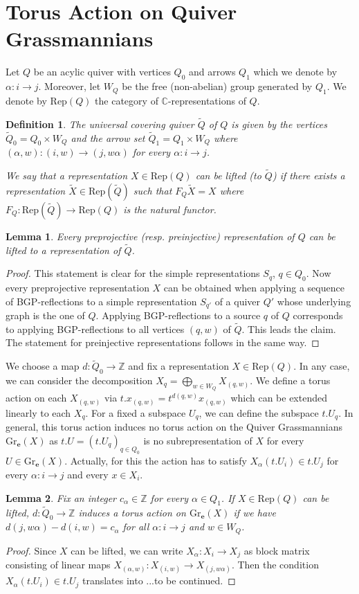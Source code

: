 \documentclass{amsart}
\newtheorem{definition}{Definition}[theorem]
\newtheorem{lemma}{Lemma}[theorem]
\newcommand{\bfe}{\mathbf{e}}
\newcommand{\C}{\mathbb{C}}
\newcommand{\Rep}{\mathrm{Rep}}
\newcommand{\Gr}{\mathrm{Gr}}
\newcommand{\ZZ}{\mathbb{Z}}
\begin{document}
\section{Torus Action on Quiver Grassmannians}
\noindent Let $Q$ be an acylic quiver with vertices $Q_0$ and arrows $Q_1$ which we denote by $\alpha:i\to j$. Moreover, let $W_{Q}$ be the free (non-abelian) group generated by $Q_1$.  We denote by $\Rep(Q)$ the category of $\C$-representations of $Q$.
\begin{definition}
The universal covering quiver $\tilde Q$ of $Q$ is given by the vertices $\tilde Q_0=Q_0\times W_{Q}$ and the arrow set $\tilde Q_1=Q_1\times W_{Q}$ where $(\alpha,w):(i,w)\to (j,w\alpha)$ for every $\alpha:i\to j$.

We say that a representation $X\in \Rep(Q)$ can be lifted (to $\tilde Q$) if there exists a representation $\tilde X\in\Rep(\tilde Q)$ such that $F_Q\tilde X=X$ where $F_Q:\Rep(\tilde Q)\to\Rep(Q)$ is the natural functor.
\end{definition}
\begin{lemma}
  Every preprojective (resp. preinjective) representation of $Q$ can be lifted to a representation of $\tilde Q$.
\end{lemma}
\begin{proof}This statement is clear for the simple representations $S_q$, $q\in Q_0$. Now every preprojective representation $X$ can be obtained when applying a sequence of BGP-reflections \cite{bgp} to a simple representation $S_{q'}$ of a quiver $Q'$ whose underlying graph is the one of $Q$. Applying BGP-reflections to a source $q$ of $Q$ corresponds to applying BGP-reflections to all vertices $(q,w)$ of $\tilde Q$. This leads the claim. The statement for preinjective representations follows in the same way.
\end{proof}
We choose a map $d:\tilde Q_0\to\ZZ$ and fix a representation $X\in\Rep(Q)$. In any case, we can consider the decomposition $X_q=\bigoplus_{w\in W_Q} X_{(q,w)}$. We define a torus action on each $X_{(q,w)}$ via $t.x_{(q,w)}=t^{d(q,w)}x_{(q,w)}$ which can be extended linearly to each $X_q$. For a fixed a subspace $U_q$, we can define the subspace $t.U_q$. In general, this torus action induces no torus action on the Quiver Grassmannians $\Gr_{\bfe}(X)$ as $t.U=(t.U_q)_{q\in Q_0}$ is no subrepresentation of $X$ for every $U\in \Gr_{\bfe}(X)$. Actually, for this the action has to satisfy $X_{\alpha}(t.U_i)\in t.U_j$ for every $\alpha:i\to j$ and every $x\in X_i$. 
\begin{lemma}Fix an integer $c_\alpha\in\ZZ$ for every $\alpha\in Q_1$.
If $X\in\Rep(Q)$ can be lifted, $d:\tilde Q_0\to\ZZ$ induces a torus action on $\Gr_\bfe(X)$ if we have $d(j,w\alpha)-d(i,w)=c_\alpha$ for all $\alpha:i\to j$ and $w\in W_{Q}$.
\end{lemma}
\begin{proof} Since $X$ can be lifted, we can write $X_\alpha:X_i\to X_j$ as block matrix consisting of linear maps $X_{(\alpha,w)}:X_{(i,w)}\to X_{(j,w\alpha)}$. Then the condition $X_{\alpha}(t.U_i)\in t.U_j$ translates into ...to be continued.
\end{proof}
\end{document}
